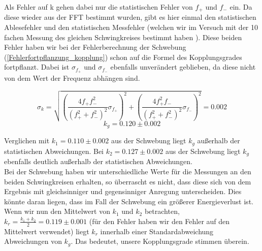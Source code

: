 \documentclass[twoside]{protokoll}
\begin{document}
Als Fehler auf k gehen dabei nur die statistischen Fehler von $f_+$ und $f_-$ ein.
Da diese wieder aus der FFT bestimmt wurden, gibt es hier einmal den statistischen Ablesefehler und den statistischen Messfehler (welchen wir im Versuch mit der 10 fachen Messung des gleichen Schwingkreises bestimmt haben ).
Diese beiden Fehler haben wir bei der Fehlerberechnung der Schwebung (\ref{Fehlerfortpflanzung_kopplung}) schon auf die Formel des Kopplungsgrades fortpflanzt.
Dabei ist $\sigma_{f_+}$ und $\sigma_{f_-}$ ebenfalls unverändert geblieben, da diese nicht von dem Wert der Frequenz abhängen sind.
 
\begin{equation}
    \sigma_k =\sqrt{\left(\frac{4f_+f_-^2}{\left(f_+^2+f_-^2\right)^2}\sigma_{f_+}\right)^2 + \left(\frac{4f_+^2f_-}{\left(f_+^2+f_-^2\right)^2}\sigma_{f_-}\right)^2}
    = 0.002 
\end{equation}
\begin{equation}
    k_g = 0.120 \pm 0.002
\end{equation}

Verglichen mit $k_1 = 0.110 \pm 0.002$ aus der Schwebung liegt $k_g$ außerhalb der statistischen Abweichungen.
Bei $k_2 = 0.127 \pm 0.002$ aus der Schwebung liegt $k_g$ ebenfalls deutlich außerhalb der statistischen Abweichungen.\\
 
Bei der Schwebung haben wir unterschiedliche Werte für die Messungen an den beiden Schwingkreisen erhalten, so überrascht es nicht, dass diese sich von dem Ergebnis mit gleichsinniger und gegensinniger Anregung unterscheiden.
Dies könnte daran liegen, dass im Fall der Schwebung ein größerer Energieverlust ist. \\

Wenn wir nun den Mittelwert von $k_1$ und $k_2$  betrachten,
$k_r = \frac{k_1 + k_2}{2} = 0.119 \pm 0.001$ 
(für den Fehler haben wir den Fehler auf den Mittelwert verwendet)
liegt $k_r$ innerhalb einer Standardabweichung Abweichungen von $k_g$.
Das  bedeutet, unsere Kopplungsgrade stimmen überein.
\end{document}
